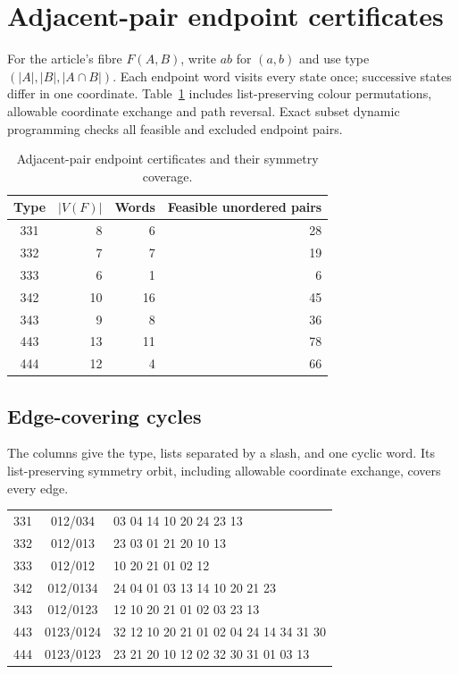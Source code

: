 \section{Adjacent-pair endpoint certificates}
\label{app:pair-five-certificates}
For the article's fibre $F(A,B)$, write $ab$ for $(a,b)$ and use type
$(|A|,|B|,|A\cap B|)$. Each endpoint word visits every state once;
successive states differ in one coordinate. Table~\ref{tab:pair-five-counts}
includes list-preserving colour permutations, allowable coordinate
exchange and path reversal. Exact subset dynamic programming checks
all feasible and excluded endpoint pairs.

\begin{table}[htbp]
\centering
\caption{Adjacent-pair endpoint certificates and their symmetry coverage.}
\label{tab:pair-five-counts}
\begin{tabular}{crrr}
\toprule
Type & $|V(F)|$ & Words & Feasible unordered pairs\\
\midrule
 331&8&6&28\\
 332&7&7&19\\
 333&6&1&6\\
 342&10&16&45\\
 343&9&8&36\\
 443&13&11&78\\
 444&12&4&66\\
\bottomrule
\end{tabular}
\end{table}


\subsection{Edge-covering cycles}
The columns give the type, lists separated by a slash, and one cyclic
word. Its list-preserving symmetry orbit, including allowable coordinate
exchange, covers every edge.
\begin{center}\small\ttfamily
\begin{tabular}{ccl}
331 & 012/034 & 03 04 14 10 20 24 23 13\\
332 & 012/013 & 23 03 01 21 20 10 13\\
333 & 012/012 & 10 20 21 01 02 12\\
342 & 012/0134 & 24 04 01 03 13 14 10 20 21 23\\
343 & 012/0123 & 12 10 20 21 01 02 03 23 13\\
443 & 0123/0124 & 32 12 10 20 21 01 02 04 24 14 34 31 30\\
444 & 0123/0123 & 23 21 20 10 12 02 32 30 31 01 03 13
\end{tabular}
\end{center}

